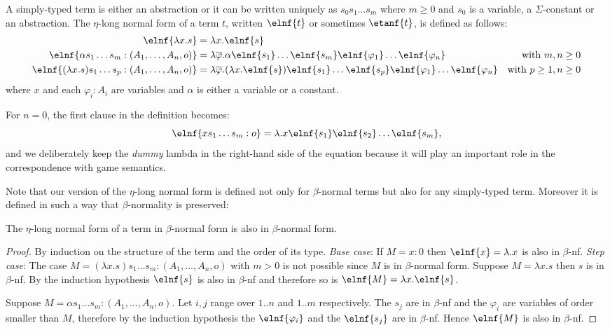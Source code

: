 \begin{definition}
A simply-typed term is either an abstraction or it can be written uniquely as
$s_0 s_1 \ldots s_m$ where $m\geq0$ and $s_0$ is a variable, a $\Sigma$-constant or an abstraction.
The $\eta$-long normal form of a term $t$, written $\elnf{t}$ or sometimes $\etanf{t}$,
is defined as follows:
\begin{align*}
\elnf{\lambda x . s } &= \lambda x . \elnf{s} \\
\elnf{\alpha s_1 \ldots s_m : (A_1,\ldots,A_n,o)} &= \lambda \overline{\varphi} . \alpha \elnf{s_1}\ldots \elnf{s_m} \elnf{\varphi_1} \ldots \elnf{\varphi_n}
& \mbox{with $m,n\geq0$}\\
\elnf{(\lambda x . s) s_1 \ldots s_p : (A_1,\ldots,A_n,o) } &= \lambda \overline{\varphi} . (\lambda x . \elnf{s}) \elnf{s_1} \ldots \elnf{s_p} \elnf{\varphi_1} \ldots \elnf{\varphi_n}
& \mbox{with $p\geq 1,n\geq 0$}
\end{align*}
where $x$ and each $\varphi_i : A_i$ are variables and $\alpha$ is
either a variable or a constant.
\end{definition}

For $n=0$, the first clause in the definition becomes:
$$\elnf{x s_1 \ldots s_m : o} = \lambda . x \elnf{s_1} \elnf{s_2} \ldots \elnf{s_m},$$
and we deliberately keep the \textsl{dummy} lambda in the right-hand
side of the equation because it will play an important role in the
correspondence with game semantics.



Note that our version of the $\eta$-long normal form is defined not only for $\beta$-normal terms but also for any simply-typed term.
Moreover it is defined in such a way that $\beta$-normality is preserved:
\begin{lemma}
The $\eta$-long normal form of a term in $\beta$-normal form is also in $\beta$-normal form.
\end{lemma}
\begin{proof}
By induction on the structure of the term and the order of its type.
\emph{Base case}:
If $M=x:0$ then $\elnf{x} = \lambda . x$ is also in $\beta$-nf.
\emph{Step case}:
The case $M = (\lambda x . s) s_1 \ldots s_m : (A_1,\ldots,A_n,o)$ with $m>0$ is not possible since $M$ is in
$\beta$-normal form.
Suppose $M = \lambda x . s$ then $s$ is in $\beta$-nf. By the induction hypothesis $\elnf{s}$ is also in $\beta$-nf and therefore
so is $\elnf{M} = \lambda x . \elnf{s}$.

Suppose $M= \alpha s_1 \ldots s_m : (A_1,\ldots,A_n,o)$. Let $i,j$
range over $1..n$ and $1..m$ respectively. The $s_j$ are in
$\beta$-nf and the $\varphi_i$ are variables of order smaller than
$M$, therefore by the induction hypothesis the $\elnf{\varphi_i}$ and
the $\elnf{s_j}$ are in $\beta$-nf. Hence $\elnf{M}$ is also in
$\beta$-nf.
\end{proof}


